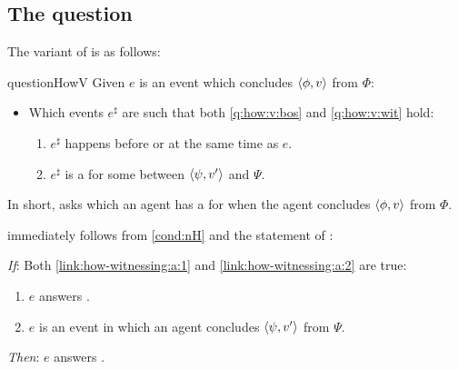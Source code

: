 \subsection{The question}
\label{cha:var:qhowv:question}

\begin{note}
  The variant of \qHow{} is as follows:

  \begin{question}{questionHowV}{\qHowV{}}%
    \label{q:how:v}%
    Given \(e\) is an event which \vAgent{} concludes \(\langle \phi, v \rangle\) from \(\Phi\):
    \begin{itemize}
    \item
      Which events \(e^{\sharp}\) are such that both \ref{q:how:v:bos} and \ref{q:how:v:wit} hold:
      \begin{enumerate}
      \item
        \label{q:how:v:bos}
        \(e^{\sharp}\) happens before or at the same time as \(e\).
      \item
        \label{q:how:v:wit}
        \(e^{\sharp}\) is a  for some \ros{} between \(\langle \psi, v' \rangle\) and \(\Psi\).
      \end{enumerate}
    \end{itemize}
    \vspace{-\baselineskip}
  \end{question}

  \noindent%
  In short, \qHowV{} asks which  an agent has a \wit{} for when the agent concludes \(\langle \phi, v \rangle\) from \(\Phi\).
\end{note}

\begin{note}
  \linkH{} immediately follows from \autoref{cond:nH} and the statement of \qHowV{}:

  \begin{link}%
    \label{link:how-witnessing}%
    \vspace{-\baselineskip}
    \begin{itenum}
    \item[\emph{If}:]
      Both \ref{link:how-witnessing:a:1} and \ref{link:how-witnessing:a:2} are true:
      \begin{enumerate}[label=\alph*., ref=(\alph*)]
      \item
        \label{link:how-witnessing:a:1}
        \(e\) answers \qHow{}.
      \item
        \label{link:how-witnessing:a:2}
        \(e\) is an event in which an agent concludes \(\langle \psi, v' \rangle\) from \(\Psi\).
      \end{enumerate}
    \item[\emph{Then}:]
      \(e\) answers \qHowV{}.
    \end{itenum}
    \vspace{-\baselineskip}
  \end{link}
\end{note}

